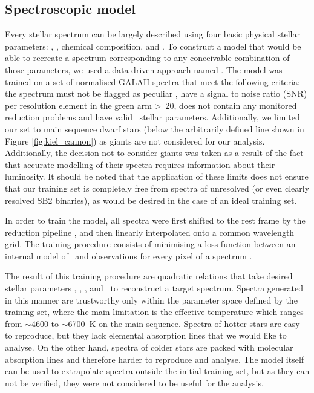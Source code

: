 \subsection{Spectroscopic model}
\label{sec:s_model}
Every stellar spectrum can be largely described using four basic physical stellar parameters: \Teff, \Logg, chemical composition, and \vsin. To construct a model that would be able to recreate a spectrum corresponding to any conceivable combination of those parameters, we used a data-driven approach named \TC. The model was trained on a set of normalised GALAH spectra that meet the following criteria: the spectrum must not be flagged as peculiar \citep{2017ApJS..228...24T}, have a signal to noise ratio (SNR) per resolution element in the green arm >~20, does not contain any monitored reduction problems and have valid \TC\ stellar parameters. Additionally, we limited our set to main sequence dwarf stars (below the arbitrarily defined line shown in Figure \ref{fig:kiel_cannon}) as giants are not considered for our analysis. Additionally, the decision not to consider giants was taken as a result of the fact that accurate modelling of their spectra requires information about their luminosity. It should be noted that the application of these limits does not ensure that our training set is completely free from spectra of unresolved (or even clearly resolved SB2 binaries), as would be desired in the case of an ideal training set.

In order to train the model, all spectra were first shifted to the rest frame by the reduction pipeline \citep{2017MNRAS.464.1259K}, and then linearly interpolated onto a common wavelength grid. The training procedure consists of minimising a loss function between an internal model of \TC\ and observations for every pixel of a spectrum \citep{2015ApJ...808...16N}.

The result of this training procedure are quadratic relations that take desired stellar parameters \Teff, \Logg, \Feh, and \vsin\ to reconstruct a target spectrum. Spectra generated in this manner are trustworthy only within the parameter space defined by the training set, where the main limitation is the effective temperature which ranges from $\sim$4600 to $\sim$6700~K on the main sequence. Spectra of hotter stars are easy to reproduce, but they lack elemental absorption lines that we would like to analyse. On the other hand, spectra of colder stars are packed with molecular absorption lines and therefore harder to reproduce and analyse. The model itself can be used to extrapolate spectra outside the initial training set, but as they can not be verified, they were not considered to be useful for the analysis.

